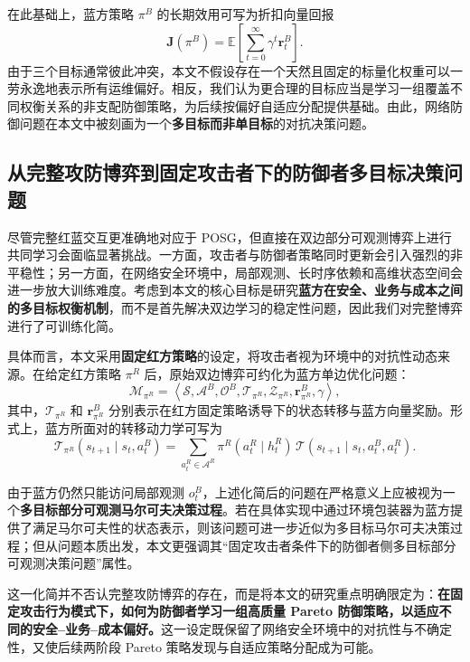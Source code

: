 \documentclass[12pt,a4paper]{article}
\begin{document}
在此基础上，蓝方策略 $\pi^B$ 的长期效用可写为折扣向量回报
\begin{equation}
\mathbf{J}(\pi^B)
=
\mathbb{E}\left[
\sum_{t=0}^{\infty}\gamma^t \mathbf{r}_t^B
\right].
\end{equation}
由于三个目标通常彼此冲突，本文不假设存在一个天然且固定的标量化权重可以一劳永逸地表示所有运维偏好。相反，我们认为更合理的目标应当是学习一组覆盖不同权衡关系的非支配防御策略，为后续按偏好自适应分配提供基础。由此，网络防御问题在本文中被刻画为一个\textbf{多目标而非单目标}的对抗决策问题。

\subsection{从完整攻防博弈到固定攻击者下的防御者多目标决策问题}

尽管完整红蓝交互更准确地对应于 POSG，但直接在双边部分可观测博弈上进行共同学习会面临显著挑战。一方面，攻击者与防御者策略同时更新会引入强烈的非平稳性；另一方面，在网络安全环境中，局部观测、长时序依赖和高维状态空间会进一步放大训练难度。考虑到本文的核心目标是研究\textbf{蓝方在安全、业务与成本之间的多目标权衡机制}，而不是首先解决双边学习的稳定性问题，因此我们对完整博弈进行了可训练化简。

具体而言，本文采用\textbf{固定红方策略}的设定，将攻击者视为环境中的对抗性动态来源。在给定红方策略 $\pi^R$ 后，原始双边博弈可约化为蓝方单边优化问题：
\begin{equation}
\mathcal{M}_{\pi^R}
=
\left\langle
\mathcal{S},
\mathcal{A}^B,
\mathcal{O}^B,
\mathcal{T}_{\pi^R},
\mathcal{Z}_{\pi^R},
\mathbf{r}_{\pi^R}^{B},
\gamma
\right\rangle,
\end{equation}
其中，$\mathcal{T}_{\pi^R}$ 和 $\mathbf{r}_{\pi^R}^{B}$ 分别表示在红方固定策略诱导下的状态转移与蓝方向量奖励。形式上，蓝方所面对的转移动力学可写为
\begin{equation}
\mathcal{T}_{\pi^R}(s_{t+1}\mid s_t,a_t^B)
=
\sum_{a_t^R\in\mathcal{A}^R}
\pi^R(a_t^R\mid h_t^R)\,
\mathcal{T}(s_{t+1}\mid s_t,a_t^B,a_t^R).
\end{equation}

由于蓝方仍然只能访问局部观测 $o_t^B$，上述化简后的问题在严格意义上应被视为一个\textbf{多目标部分可观测马尔可夫决策过程}。若在具体实现中通过环境包装器为蓝方提供了满足马尔可夫性的状态表示，则该问题可进一步近似为多目标马尔可夫决策过程；但从问题本质出发，本文更强调其“固定攻击者条件下的防御者侧多目标部分可观测决策问题”属性。

这一化简并不否认完整攻防博弈的存在，而是将本文的研究重点明确限定为：\textbf{在固定攻击行为模式下，如何为防御者学习一组高质量 Pareto 防御策略，以适应不同的安全--业务--成本偏好。}这一设定既保留了网络安全环境中的对抗性与不确定性，又使后续两阶段 Pareto 策略发现与自适应策略分配成为可能。
\end{document}
